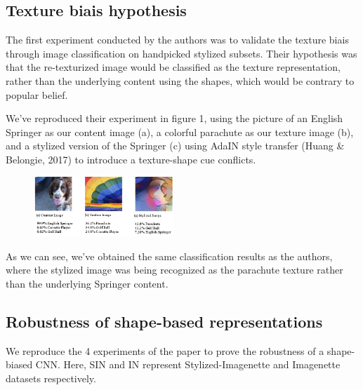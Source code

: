 \documentclass{article}
\begin{document}
\subsection{Texture biais hypothesis}

The first experiment conducted by the authors was to validate the texture biais 
through image classification on handpicked stylized subsets. 
Their hypothesis was that the re-texturized image would be classified as the texture representation, rather than 
the underlying content using the shapes, which would be contrary to popular belief. \smallskip

\noindent
We've reproduced their experiment in figure 1, %
using the picture of an English Springer as our content image (a), 
a colorful parachute as our texture image (b),
and a stylized version of the Springer (c) using AdaIN style transfer 
(Huang \& Belongie, 2017) %
to introduce a texture-shape cue conflicts.

\begin{figure}[h!]\center
  \includegraphics[width=0.47\textwidth]{imgs/results-textures}
\end{figure}

\noindent
As we can see, we've obtained the same classification results as the authors, 
where the stylized image was being recognized as the parachute texture
rather than the underlying Springer content.

\subsection{Robustness of shape-based representations}

We reproduce the 4 experiments of the paper to prove the robustness of a shape-biased CNN.
Here, SIN and IN represent Stylized-Imagenette and Imagenette datasets respectively.
\end{document}

